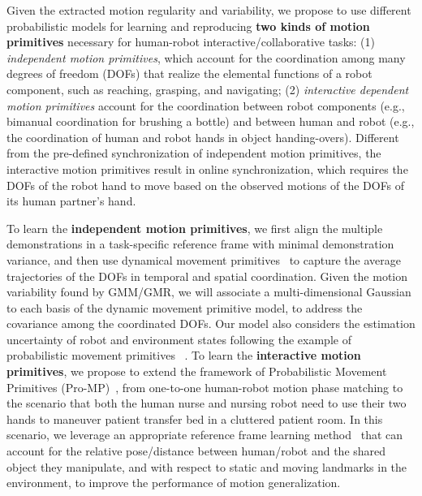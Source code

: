 \documentclass[letterpaper, 11 pt, onecolumn]{article}
\begin{document}
Given the extracted motion regularity and variability, we propose to use different probabilistic models for learning and reproducing \textbf{two kinds of motion primitives} necessary for human-robot interactive/collaborative tasks: (1) \textit{independent motion primitives}, which account for the coordination among many degrees of freedom (DOFs) that realize the elemental functions of a robot component, such as reaching, grasping, and navigating; (2) \textit{interactive dependent motion primitives} account for the coordination between robot components (e.g., bimanual coordination for brushing a bottle) and between human and robot (e.g., the coordination of human and robot hands in object handing-overs). Different from the pre-defined synchronization of independent motion primitives, the interactive motion primitives result in online synchronization, which requires the DOFs of the robot hand to move based on the observed motions of the DOFs of its human partner's hand.   

To learn the \textbf{independent motion primitives}, we first align the multiple demonstrations in a task-specific reference frame with minimal demonstration variance, and then use dynamical movement primitives~\cite{ijspeert2013dynamical} to capture the average trajectories of the DOFs in temporal and spatial coordination. Given the motion variability found by GMM/GMR, we will associate a multi-dimensional Gaussian to each basis of the dynamic movement primitive model, to address the covariance among the coordinated DOFs. Our model also considers the estimation uncertainty of robot and environment states following the example of probabilistic movement primitives ~\cite{meier2016probabilistic}. To learn the \textbf{interactive motion primitives}, we propose to extend the framework of Probabilistic Movement Primitives (Pro-MP)~\cite{maeda2017phase}, from one-to-one human-robot motion phase matching to the scenario that both the human nurse and nursing robot need to use their two hands to maneuver patient transfer bed in a cluttered patient room. In this scenario, we leverage an appropriate reference frame learning method~\cite{cederborg2010incremental,dong2012learning} that can account for the relative pose/distance between human/robot and the shared object they manipulate, and with respect to static and moving landmarks in the environment, to improve the performance of motion generalization.

\end{document}
